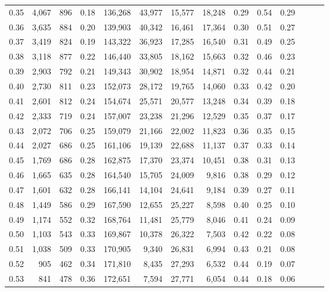 \begin{tabular}{rrrrrrrrrrrrrr}
0.35 &  4,067 &  896 &  0.18 &  136,268 &   43,977 &  15,577 &  18,248 &  0.29 &  0.54 &      0.29 \\
0.36 &  3,635 &  884 &  0.20 &  139,903 &   40,342 &  16,461 &  17,364 &  0.30 &  0.51 &      0.27 \\
0.37 &  3,419 &  824 &  0.19 &  143,322 &   36,923 &  17,285 &  16,540 &  0.31 &  0.49 &      0.25 \\
0.38 &  3,118 &  877 &  0.22 &  146,440 &   33,805 &  18,162 &  15,663 &  0.32 &  0.46 &      0.23 \\
0.39 &  2,903 &  792 &  0.21 &  149,343 &   30,902 &  18,954 &  14,871 &  0.32 &  0.44 &      0.21 \\
0.40 &  2,730 &  811 &  0.23 &  152,073 &   28,172 &  19,765 &  14,060 &  0.33 &  0.42 &      0.20 \\
0.41 &  2,601 &  812 &  0.24 &  154,674 &   25,571 &  20,577 &  13,248 &  0.34 &  0.39 &      0.18 \\
0.42 &  2,333 &  719 &  0.24 &  157,007 &   23,238 &  21,296 &  12,529 &  0.35 &  0.37 &      0.17 \\
0.43 &  2,072 &  706 &  0.25 &  159,079 &   21,166 &  22,002 &  11,823 &  0.36 &  0.35 &      0.15 \\
0.44 &  2,027 &  686 &  0.25 &  161,106 &   19,139 &  22,688 &  11,137 &  0.37 &  0.33 &      0.14 \\
0.45 &  1,769 &  686 &  0.28 &  162,875 &   17,370 &  23,374 &  10,451 &  0.38 &  0.31 &      0.13 \\
0.46 &  1,665 &  635 &  0.28 &  164,540 &   15,705 &  24,009 &   9,816 &  0.38 &  0.29 &      0.12 \\
0.47 &  1,601 &  632 &  0.28 &  166,141 &   14,104 &  24,641 &   9,184 &  0.39 &  0.27 &      0.11 \\
0.48 &  1,449 &  586 &  0.29 &  167,590 &   12,655 &  25,227 &   8,598 &  0.40 &  0.25 &      0.10 \\
0.49 &  1,174 &  552 &  0.32 &  168,764 &   11,481 &  25,779 &   8,046 &  0.41 &  0.24 &      0.09 \\
0.50 &  1,103 &  543 &  0.33 &  169,867 &   10,378 &  26,322 &   7,503 &  0.42 &  0.22 &      0.08 \\
0.51 &  1,038 &  509 &  0.33 &  170,905 &    9,340 &  26,831 &   6,994 &  0.43 &  0.21 &      0.08 \\
0.52 &    905 &  462 &  0.34 &  171,810 &    8,435 &  27,293 &   6,532 &  0.44 &  0.19 &      0.07 \\
0.53 &    841 &  478 &  0.36 &  172,651 &    7,594 &  27,771 &   6,054 &  0.44 &  0.18 &      0.06 \\

\end{tabular}
